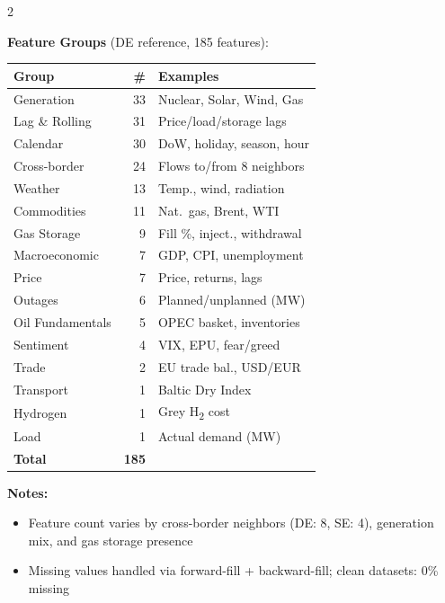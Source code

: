 \documentclass[11pt,a4paper]{article}
\begin{document}
\begin{multicols}{2}

\textbf{Feature Groups} (DE reference, 185 features):
\vspace{0.1cm}

\small
\begin{tabular}{l r l}
\toprule
\textbf{Group} & \textbf{\#} & \textbf{Examples} \\
\midrule
Generation       & 33 & Nuclear, Solar, Wind, Gas \\
Lag \& Rolling   & 31 & Price/load/storage lags \\
Calendar         & 30 & DoW, holiday, season, hour \\
Cross-border     & 24 & Flows to/from 8 neighbors \\
Weather          & 13 & Temp., wind, radiation \\
Commodities      & 11 & Nat.\ gas, Brent, WTI \\
Gas Storage      &  9 & Fill \%, inject., withdrawal \\
Macroeconomic    &  7 & GDP, CPI, unemployment \\
Price            &  7 & Price, returns, lags \\
Outages          &  6 & Planned/unplanned (MW) \\
Oil Fundamentals &  5 & OPEC basket, inventories \\
Sentiment        &  4 & VIX, EPU, fear/greed \\
Trade            &  2 & EU trade bal., USD/EUR \\
Transport        &  1 & Baltic Dry Index \\
Hydrogen         &  1 & Grey H\textsubscript{2} cost \\
Load             &  1 & Actual demand (MW) \\
\midrule
\textbf{Total}   & \textbf{185} & \\
\bottomrule
\end{tabular}

\vspace{0.3cm}

{\footnotesize
\textbf{Notes:}
\begin{itemize}[nosep, leftmargin=1em]
    \item Feature count varies by cross-border neighbors (DE: 8, SE: 4), generation mix, and gas storage presence
    \item Missing values handled via forward-fill + backward-fill; clean datasets: 0\% missing
\end{itemize}
}


\end{multicols}
\end{document}
